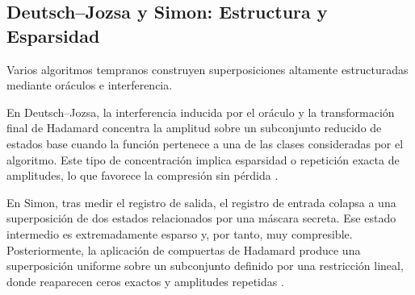 \subsection{Deutsch--Jozsa y Simon: Estructura y Esparsidad}
\label{subsec:patrones_dj_simon}

Varios algoritmos tempranos construyen superposiciones altamente estructuradas mediante oráculos e interferencia.

En Deutsch--Jozsa, la interferencia inducida por el oráculo y la transformación final de Hadamard concentra la amplitud sobre un subconjunto reducido de estados base cuando la función pertenece a una de las clases consideradas por el algoritmo. Este tipo de concentración implica esparsidad o repetición exacta de amplitudes, lo que favorece la compresión sin pérdida \parencite{DeutschJozsa1992, Nielsen2010}.

En Simon, tras medir el registro de salida, el registro de entrada colapsa a una superposición de dos estados relacionados por una máscara secreta. Ese estado intermedio es extremadamente esparso y, por tanto, muy compresible. Posteriormente, la aplicación de compuertas de Hadamard produce una superposición uniforme sobre un subconjunto definido por una restricción lineal, donde reaparecen ceros exactos y amplitudes repetidas \parencite{Simon1997, Nielsen2010}.
